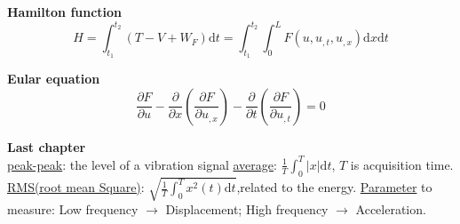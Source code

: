 \documentclass{article}
\begin{document}
\begin{multicols*}{3}
  \noindent\textbf{Hamilton function}
  \begin{equation*}
    H=\int_{t_{1}}^{t_{2}}(T-V+W_{F})\text{d}t
    =\int_{t_{1}}^{t_{2}}\int_{0}^{L}F(u,u_{,t},u_{,x})\text{d}x\text{d}t
  \end{equation*}

  \noindent\textbf{Eular equation}
  \begin{equation*}
    \frac{\partial F}{\partial u}-\frac{\partial}{\partial x}(\frac{\partial F}{\partial u_{,x}})-\frac{\partial}{\partial t}(\frac{\partial F}{\partial u_{,t}})=0
  \end{equation*}

  \noindent\textbf{Last chapter}\\
  \underline{peak-peak}: the level of a vibration signal
  \underline{average}: $\frac{1}{T}\int_{0}^{T}|x|\text{d}t$, $T$ is acquisition time.
  \underline{RMS(root mean Square)}: $\sqrt{\frac{1}{T}\int_{0}^{T}x^{2}(t)\text{d}t}$,related  to the energy.
  \underline{Parameter} to measure: Low frequency $\rightarrow$ Displacement; High frequency $\rightarrow$ Acceleration.


\end{multicols*}
\end{document}
